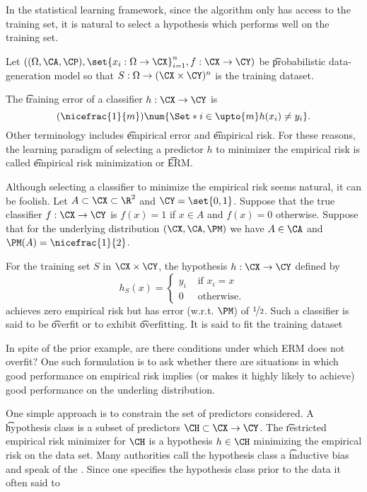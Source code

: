 

In the statistical learning framework, since the algorithm only has access to the training set, it is natural to select a hypothesis which performs well on the training set.


Let $((\Omega, \CA, \CP), \set{x_i: \Omega \to \CX}_{i=1}^{n}, f: \CX \to \CY)$ be \t{probabilistic data-generation model} so that $S: \Omega \to (\CX \times \CY)^{n}$ is the training dataset.

The \t{training error} of a classifier $h: \CX \to \CY$ is
\[
  (\nicefrac{1}{m})\num{\Set*{i \in \upto{m}}{h(x_i) \neq y_i}}.
\]
Other terminology includes \t{empirical error} and \t{empirical risk}.
For these reasons, the learning paradigm of selecting a predictor $h$ to minimizer the empirical risk is called \t{empirical risk minimization} or \t{ERM}.


Although selecting a classifier to minimize the empirical risk seems natural, it can be foolish.
Let $A \subset \CX \subset \R^2$ and $\CY = \set{0, 1}$.
Suppose that the true classifier $f: \CX \to \CY$ is $f(x) = 1$ if $x \in A$ and $f(x) = 0$ otherwise.
Suppose that for the underlying distribution $(\CX, \CA, \PM)$ we have $A \in \CA$ and $\PM(A) = \nicefrac{1}{2}$.

For the training set $S$ in $\CX \times \CY$, the hypothesis $h: \CX \to \CY$ defined by
\[
	h_S(x) = \begin{cases}
 	y_i & \text{ if } x_i = x \\
 	0 & \text{ otherwise. }
 \end{cases}
\]
achieves zero empirical risk but has error (w.r.t. $\PM$) of $\nicefrac{1}{2}$.
Such a classifier is said to be \t{overfit} or to exhibit \t{overfitting}.
It is said to fit the training dataset 


In spite of the prior example, are there conditions under which ERM does not overfit?
One such formulation is to ask whether there are situations in which good performance on empirical risk implies (or makes it highly likely to achieve) good performance on the underling distribution.

One simple approach is to constrain the set of predictors considered.
A \t{hypothesis class} is a subset of predictors $\CH \subset \CX \to \CY$.
The \t{restricted empirical risk minimizer} for $\CH$ is a hypothesis $h \in \CH$ minimizing the empirical risk on the data set.
Many authorities call the hypothesis class a \t{inductive bias} and speak of  the .
Since one specifies the hypothesis class prior to the data it often said to 

\blankpage
